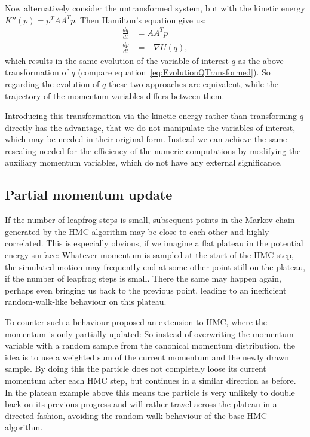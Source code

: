 Now alternatively consider the untransformed system, but with the kinetic energy $K''(p) = p^T A A^T p$. Then Hamilton's equation give us:
\begin{equation}
\begin{split}
\frac{dq}{dt} &= A A^T p \\
\frac{dp}{dt} &= - \nabla U(q),
\end{split}
\end{equation}
which results in the same evolution of the variable of interest $q$ as the above transformation of $q$ (compare equation~\eqref{eq:EvolutionQTransformed}). So regarding the evolution of $q$ these two approaches are equivalent, while the trajectory of the momentum variables differs between them.

Introducing this transformation via the kinetic energy rather than transforming $q$ directly has the advantage, that we do not manipulate the variables of interest, which may be needed in their original form. Instead we can achieve the same rescaling needed for the efficiency of the numeric computations by modifying the auxiliary momentum variables, which do not have any external significance.

\subsection{Partial momentum update}
\label{sec:PartialMomentumUpdate}
If the number of leapfrog steps is small, subsequent points in the Markov chain generated by the HMC algorithm may be close to each other and highly correlated. This is especially obvious, if we imagine a flat plateau in the potential energy surface: Whatever momentum is sampled at the start of the HMC step, the simulated motion may frequently end at some other point still on the plateau, if the number of leapfrog steps is small. There the same may happen again, perhaps even bringing us back to the previous point, leading to an inefficient random-walk-like behaviour on this plateau.

To counter such a behaviour \parencite{Horowitz1991} proposed an extension to HMC, where the momentum is only partially updated: So instead of overwriting the momentum variable with a random sample from the canonical momentum distribution, the idea is to use a weighted sum of the current momentum and the newly drawn sample. By doing this the particle does not completely loose its current momentum after each HMC step, but continues in a similar direction as before. In the plateau example above this means the particle is very unlikely to double back on its previous progress and will rather travel across the plateau in a directed fashion, avoiding the random walk behaviour of the base HMC algorithm.

